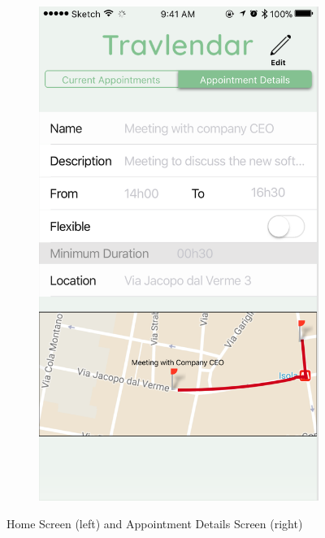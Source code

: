 \documentclass[12pt]{article}
\begin{document}
\begin{figure}[H]
\begin{subfigure}{.4\textwidth}
        \includegraphics[scale=0.44]{interfaceAppointment.png}
        \label{fig:newAppointmentScreen}
    \end{subfigure}
    \caption{Home Screen (left) and Appointment Details Screen (right)}
\end{figure}
\end{document}
